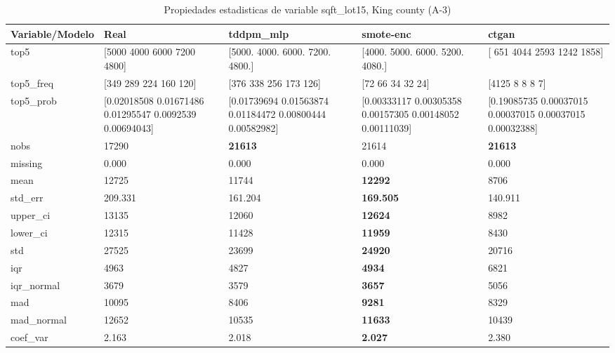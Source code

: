 \begin{table}[H]
\centering
\fontsize{8}{14}\selectfont
\caption{Propiedades  estadisticas de variable sqft\_lot15, King county (A-3)}
\label{table-stats-king county-a-3-sqft_lot15}
\begin{tabular}{|l|m{10em}|m{10em}|m{10em}|m{10em}|}
\hline
 \rowcolor[gray]{0.8}
Variable/Modelo & Real & tddpm\_mlp & smote-enc & ctgan \\
\hline top5 & [5000 4000 6000 7200 4800] & [5000. 4000. 6000. 7200. 4800.] & [4000. 5000. 6000. 5200. 4080.] & [ 651 4044 2593 1242 1858] \\
\hline top5\_freq & [349 289 224 160 120] & [376 338 256 173 126] & [72 66 34 32 24] & [4125    8    8    8    7] \\
\hline top5\_prob & [0.02018508 0.01671486 0.01295547 0.0092539  0.00694043] & [0.01739694 0.01563874 0.01184472 0.00800444 0.00582982] & [0.00333117 0.00305358 0.00157305 0.00148052 0.00111039] & [0.19085735 0.00037015 0.00037015 0.00037015 0.00032388] \\
\hline nobs & 17290 & \bfseries 21613 & \cellcolor[rgb]{0.9, 0.54, 0.52} 21614 & \bfseries 21613 \\
\hline missing & 0.000 & 0.000 & 0.000 & 0.000 \\
\hline mean & 12725 & 11744 & \bfseries 12292 & \cellcolor[rgb]{0.9, 0.54, 0.52} 8706 \\
\hline std\_err & 209.331 & 161.204 & \bfseries 169.505 & \cellcolor[rgb]{0.9, 0.54, 0.52} 140.911 \\
\hline upper\_ci & 13135 & 12060 & \bfseries 12624 & \cellcolor[rgb]{0.9, 0.54, 0.52} 8982 \\
\hline lower\_ci & 12315 & 11428 & \bfseries 11959 & \cellcolor[rgb]{0.9, 0.54, 0.52} 8430 \\
\hline std & 27525 & 23699 & \bfseries 24920 & \cellcolor[rgb]{0.9, 0.54, 0.52} 20716 \\
\hline iqr & 4963 & 4827 & \bfseries 4934 & \cellcolor[rgb]{0.9, 0.54, 0.52} 6821 \\
\hline iqr\_normal & 3679 & 3579 & \bfseries 3657 & \cellcolor[rgb]{0.9, 0.54, 0.52} 5056 \\
\hline mad & 10095 & 8406 & \bfseries 9281 & \cellcolor[rgb]{0.9, 0.54, 0.52} 8329 \\
\hline mad\_normal & 12652 & 10535 & \bfseries 11633 & \cellcolor[rgb]{0.9, 0.54, 0.52} 10439 \\
\hline coef\_var & 2.163 & 2.018 & \bfseries 2.027 & \cellcolor[rgb]{0.9, 0.54, 0.52} 2.380 \\

\end{tabular}
\end{table}
